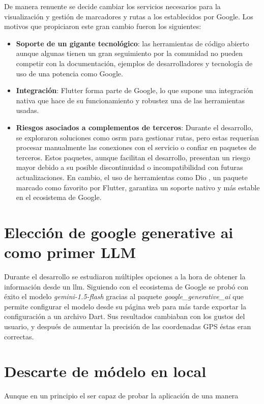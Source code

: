 De manera renuente se decide cambiar los servicios necesarios para la visualización y gestión de marcadores y rutas a los establecidos por Google. Los motivos que propiciaron este gran cambio fueron los siguientes:
\begin{itemize}
	\item \textbf{Soporte de un gigante tecnológico}: las herramientas de código abierto aunque algunas tienen un gran seguimiento por la comunidad no pueden competir con la documentación, ejemplos de desarrolladores y tecnología de uso de una potencia como Google.
	\item \textbf{Integración}: Flutter forma parte de Google, lo que supone una integración nativa que hace de su funcionamiento y robustez una de las herramientas usadas.
	\item \textbf{Riesgos asociados a complementos de terceros}: Durante el desarrollo, se exploraron soluciones como \acrfull{osrm} para gestionar rutas, pero estas requerían procesar manualmente las conexiones con el servicio o confiar en paquetes de terceros. Estos paquetes, aunque facilitan el desarrollo, presentan un riesgo mayor debido a su posible discontinuidad o incompatibilidad con futuras actualizaciones. En cambio, el uso de herramientas como Dio \cite{dio_package}, un paquete marcado como favorito por Flutter, garantiza un soporte nativo y más estable en el ecosistema de Google.
\end{itemize} 

\section{Elección de google generative ai como primer LLM}
Durante el desarrollo se estudiaron múltiples opciones a la hora de obtener la información desde un \acrshort{llm}. 
Siguiendo con el ecosistema de Google se probó con éxito el modelo \textit{gemini-1.5-flash} gracias al paquete \textit{google\_generative\_ai} que permite configurar el modelo desde su página web para más tarde exportar la configuración a un archivo Dart. Sus resultados cambiaban con los gustos del usuario, y después de aumentar la precisión de las coordenadas GPS éstas eran correctas.
\
\section{Descarte de módelo en local}
Aunque en un principio el ser capaz de probar la aplicación de una manera 
\todo{Continuar...}

